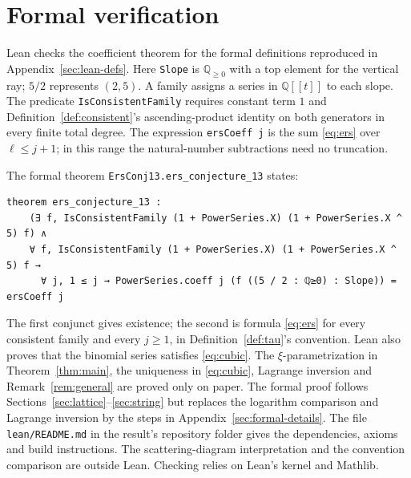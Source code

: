 \documentclass[11pt]{article}
\theoremstyle{definition}
\theoremstyle{remark}
\numberwithin{equation}{section}
\newcommand{\Q}{\mathbb{Q}}
\newcommand{\ps}[1]{\Q[\![#1]\!]}
\begin{document}
\section{Formal verification}\label{sec:lean}
Lean checks the coefficient theorem for the formal definitions reproduced
in Appendix~\ref{sec:lean-defs}.
Here \texttt{Slope} is $\mathbb Q_{\geq0}$ with a top element for the
vertical ray; $5/2$ represents $(2,5)$. A family assigns a series in
$\ps{t}$ to each slope. The predicate \texttt{IsConsistentFamily}
requires constant term $1$ and Definition~\ref{def:consistent}'s
ascending-product identity on both generators in every finite total
degree. The expression \texttt{ersCoeff j} is the sum \eqref{eq:ers} over
$\ell\leq j+1$; in this range the natural-number subtractions need no
truncation.
\begin{samepage}
The formal theorem \texttt{ErsConj13.ers\_conjecture\_13} states:
{\scriptsize
\begin{verbatim}
theorem ers_conjecture_13 :
    (∃ f, IsConsistentFamily (1 + PowerSeries.X) (1 + PowerSeries.X ^ 5) f) ∧
    ∀ f, IsConsistentFamily (1 + PowerSeries.X) (1 + PowerSeries.X ^ 5) f →
      ∀ j, 1 ≤ j → PowerSeries.coeff j (f ((5 / 2 : ℚ≥0) : Slope)) = ersCoeff j
\end{verbatim}
}
\end{samepage}
The first conjunct gives existence; the second is formula \eqref{eq:ers}
for every consistent family and every $j\geq1$, in
Definition~\ref{def:tau}'s convention. Lean also proves that the binomial
series satisfies \eqref{eq:cubic}. The $\xi$-parametrization in
Theorem~\ref{thm:main}, the uniqueness in \eqref{eq:cubic},
Lagrange inversion and Remark~\ref{rem:general} are proved only on paper.
The formal proof follows Sections~\ref{sec:lattice}--\ref{sec:string} but
replaces the logarithm comparison and Lagrange inversion by the steps in
Appendix~\ref{sec:formal-details}. The file \texttt{lean/README.md} in the
result's repository folder gives the dependencies, axioms and build
instructions. The scattering-diagram interpretation and the convention
comparison are outside Lean.
Checking relies on Lean's kernel and Mathlib.
\end{document}
